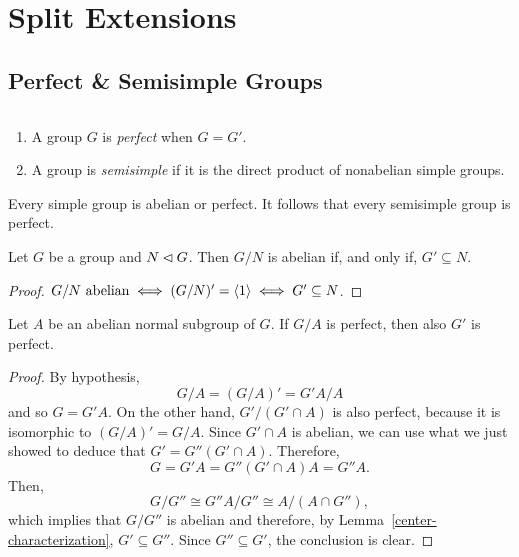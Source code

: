 \chapter{Split Extensions}

\section{Perfect \& Semisimple Groups}

\begin{defns}${}$

    \begin{enumerate}[-]
    \item A group\/ $G$ is \textsl{perfect} when\/ $G=G'$.

    \item A group is \textsl{semisimple} if it is the direct product of nonabelian simple groups.

    \end{enumerate}

\end{defns}

\begin{rem}
    Every simple group is abelian or perfect. It follows that every semisimple group is perfect.
\end{rem}

\begin{lem}\label{center-characterization}
    Let\/ $G$ be a group and\/ $N\lhd G$. Then\/ $G/N$ is abelian if, and only if, $G'\subseteq N$.
\end{lem}
    
\begin{proof} $G/N \text{ abelian} \iff (G/N)'=\langle1\rangle \iff G'\subseteq N$.
 \end{proof}

\begin{prop}\label{G/abelian-perfect}
    Let\/ $A$ be an abelian normal subgroup of\/ $G$. If\/ $G/A$ is perfect, then also\/ $G'$ is perfect.
\end{prop}

\begin{proof} By hypothesis,
$$
    G/A = (G/A)' = G'A/A
$$
and so $G=G'A$. On the other hand, $G'/(G'\cap A)$ is also perfect, because it is isomorphic to $(G/A)' = G/A$. Since $G'\cap A$ is abelian, we can use what we just showed to deduce that $G'=G''(G'\cap A)$. Therefore,
$$
    G = G'A = G''(G'\cap A)A = G''A.
$$
Then,
$$
    G/G'' \cong G''A/G'' \cong A/(A\cap G''),
$$
which implies that $G/G''$ is abelian and therefore, by Lemma~\ref{center-characterization}, $G'\subseteq G''$. Since $G''\subseteq G'$, the conclusion is clear.  \end{proof}

